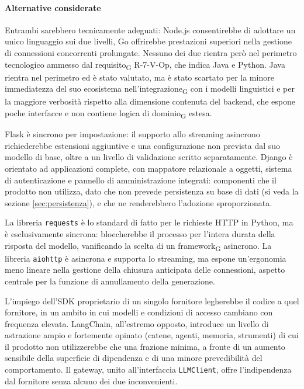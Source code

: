 \documentclass[a4paper, 10pt]{article}
\newenvironment{alternative}{%
  \begin{description}[
    style=nextline,
    leftmargin=0pt,
    labelindent=0pt,
    labelsep=0pt,
    font=\normalfont\bfseries,
    topsep=0.6em,
    itemsep=0.9em,
    parsep=0pt
  ]%
}{%
  \end{description}%
}
\newcommand{\altitem}[1]{\item[\textbullet\enspace #1]}
\begin{document}
\paragraph{Alternative considerate}\mbox{}

\begin{alternative}

\altitem{Node.js con TypeScript e Go al posto di Python}
Entrambi sarebbero tecnicamente adeguati: Node.js consentirebbe di adottare un unico linguaggio sui due livelli, Go offrirebbe prestazioni superiori nella gestione di connessioni concorrenti prolungate. Nessuno dei due rientra però nel perimetro tecnologico ammesso dal requisito\textsubscript{G} R-7-V-Op, che indica Java e Python. Java rientra nel perimetro ed è stato valutato, ma è stato scartato per la minore immediatezza del suo ecosistema nell'integrazione\textsubscript{G} con i modelli linguistici e per la maggiore verbosità rispetto alla dimensione contenuta del backend, che espone poche interfacce e non contiene logica di dominio\textsubscript{G} estesa.

\altitem{Flask e Django al posto di FastAPI}
Flask è sincrono per impostazione: il supporto allo streaming asincrono richiederebbe estensioni aggiuntive e una configurazione non prevista dal suo modello di base, oltre a un livello di validazione scritto separatamente. Django è orientato ad applicazioni complete, con mappatore relazionale a oggetti, sistema di autenticazione e pannello di amministrazione integrati: componenti che il prodotto non utilizza, dato che non prevede persistenza su base di dati (si veda la sezione \ref{sec:persistenza}), e che ne renderebbero l'adozione sproporzionata.

\altitem{requests e aiohttp al posto di httpx}
La libreria \texttt{requests} è lo standard di fatto per le richieste HTTP in Python, ma è esclusivamente sincrona: bloccherebbe il processo per l'intera durata della risposta del modello, vanificando la scelta di un framework\textsubscript{G} asincrono. La libreria \texttt{aiohttp} è asincrona e supporta lo streaming, ma espone un'ergonomia meno lineare nella gestione della chiusura anticipata delle connessioni, aspetto centrale per la funzione di annullamento della generazione.

\altitem{SDK diretto del fornitore e LangChain al posto del gateway}
L'impiego dell'SDK proprietario di un singolo fornitore legherebbe il codice a quel fornitore, in un ambito in cui modelli e condizioni di accesso cambiano con frequenza elevata. LangChain, all'estremo opposto, introduce un livello di astrazione ampio e fortemente opinato (catene, agenti, memoria, strumenti) di cui il prodotto non utilizzerebbe che una frazione minima, a fronte di un aumento sensibile della superficie di dipendenza e di una minore prevedibilità del comportamento. Il gateway, unito all'interfaccia \texttt{LLMClient}, offre l'indipendenza dal fornitore senza alcuno dei due inconvenienti.


\end{alternative}
\end{document}
